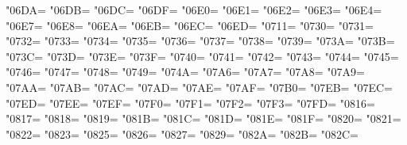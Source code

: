 \XeTeXcharclass"06DA=\KclassCM
\XeTeXcharclass"06DB=\KclassCM
\XeTeXcharclass"06DC=\KclassCM
\XeTeXcharclass"06DF=\KclassCM
\XeTeXcharclass"06E0=\KclassCM
\XeTeXcharclass"06E1=\KclassCM
\XeTeXcharclass"06E2=\KclassCM
\XeTeXcharclass"06E3=\KclassCM
\XeTeXcharclass"06E4=\KclassCM
\XeTeXcharclass"06E7=\KclassCM
\XeTeXcharclass"06E8=\KclassCM
\XeTeXcharclass"06EA=\KclassCM
\XeTeXcharclass"06EB=\KclassCM
\XeTeXcharclass"06EC=\KclassCM
\XeTeXcharclass"06ED=\KclassCM
\XeTeXcharclass"0711=\KclassCM
\XeTeXcharclass"0730=\KclassCM
\XeTeXcharclass"0731=\KclassCM
\XeTeXcharclass"0732=\KclassCM
\XeTeXcharclass"0733=\KclassCM
\XeTeXcharclass"0734=\KclassCM
\XeTeXcharclass"0735=\KclassCM
\XeTeXcharclass"0736=\KclassCM
\XeTeXcharclass"0737=\KclassCM
\XeTeXcharclass"0738=\KclassCM
\XeTeXcharclass"0739=\KclassCM
\XeTeXcharclass"073A=\KclassCM
\XeTeXcharclass"073B=\KclassCM
\XeTeXcharclass"073C=\KclassCM
\XeTeXcharclass"073D=\KclassCM
\XeTeXcharclass"073E=\KclassCM
\XeTeXcharclass"073F=\KclassCM
\XeTeXcharclass"0740=\KclassCM
\XeTeXcharclass"0741=\KclassCM
\XeTeXcharclass"0742=\KclassCM
\XeTeXcharclass"0743=\KclassCM
\XeTeXcharclass"0744=\KclassCM
\XeTeXcharclass"0745=\KclassCM
\XeTeXcharclass"0746=\KclassCM
\XeTeXcharclass"0747=\KclassCM
\XeTeXcharclass"0748=\KclassCM
\XeTeXcharclass"0749=\KclassCM
\XeTeXcharclass"074A=\KclassCM
\XeTeXcharclass"07A6=\KclassCM
\XeTeXcharclass"07A7=\KclassCM
\XeTeXcharclass"07A8=\KclassCM
\XeTeXcharclass"07A9=\KclassCM
\XeTeXcharclass"07AA=\KclassCM
\XeTeXcharclass"07AB=\KclassCM
\XeTeXcharclass"07AC=\KclassCM
\XeTeXcharclass"07AD=\KclassCM
\XeTeXcharclass"07AE=\KclassCM
\XeTeXcharclass"07AF=\KclassCM
\XeTeXcharclass"07B0=\KclassCM
\XeTeXcharclass"07EB=\KclassCM
\XeTeXcharclass"07EC=\KclassCM
\XeTeXcharclass"07ED=\KclassCM
\XeTeXcharclass"07EE=\KclassCM
\XeTeXcharclass"07EF=\KclassCM
\XeTeXcharclass"07F0=\KclassCM
\XeTeXcharclass"07F1=\KclassCM
\XeTeXcharclass"07F2=\KclassCM
\XeTeXcharclass"07F3=\KclassCM
\XeTeXcharclass"07FD=\KclassCM
\XeTeXcharclass"0816=\KclassCM
\XeTeXcharclass"0817=\KclassCM
\XeTeXcharclass"0818=\KclassCM
\XeTeXcharclass"0819=\KclassCM
\XeTeXcharclass"081B=\KclassCM
\XeTeXcharclass"081C=\KclassCM
\XeTeXcharclass"081D=\KclassCM
\XeTeXcharclass"081E=\KclassCM
\XeTeXcharclass"081F=\KclassCM
\XeTeXcharclass"0820=\KclassCM
\XeTeXcharclass"0821=\KclassCM
\XeTeXcharclass"0822=\KclassCM
\XeTeXcharclass"0823=\KclassCM
\XeTeXcharclass"0825=\KclassCM
\XeTeXcharclass"0826=\KclassCM
\XeTeXcharclass"0827=\KclassCM
\XeTeXcharclass"0829=\KclassCM
\XeTeXcharclass"082A=\KclassCM
\XeTeXcharclass"082B=\KclassCM
\XeTeXcharclass"082C=\KclassCM
